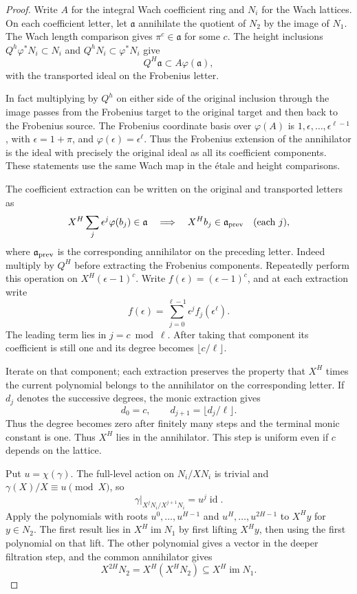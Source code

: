 \begin{proof}
Write \(A\) for the integral Wach coefficient ring
and \(N_i\) for the Wach lattices. On each coefficient
letter, let \(\mathfrak a\) annihilate the quotient of
\(N_2\) by the image of \(N_1\).
The Wach length comparison gives
\(\pi^c\in\mathfrak a\) for some \(c\).
The height inclusions
\(Q^h\varphi^*N_i\subset N_i\) and
\(Q^hN_i\subset\varphi^*N_i\) give
\[
 Q^H\mathfrak a\subset A\varphi(\mathfrak a),
\]
with the transported ideal on the Frobenius letter.

In fact multiplying by \(Q^h\) on either side of
the original inclusion through the image passes from
the Frobenius target to the original target and
then back to the Frobenius source. The Frobenius
coordinate basis over \(\varphi(A)\) is
\(1,\epsilon,\ldots,\epsilon^{\ell-1}\), with
\(\epsilon=1+\pi\), and \(\varphi(\epsilon)=\epsilon^\ell\).
Thus the Frobenius extension of the annihilator is
the ideal with precisely the original ideal as all
its coefficient components. These statements use
the same Wach map in the étale and height comparisons.

The coefficient extraction can be written on the original and transported letters as
\[
 X^H\sum_j\epsilon^j\varphi(b_j)\in\mathfrak a\quad\Longrightarrow\quad X^H b_j\in\mathfrak a_{\rm prev}\quad(\text{each }j),
\]
where \(\mathfrak a_{\rm prev}\) is the corresponding annihilator on the preceding letter. Indeed multiply by \(Q^H\) before extracting the Frobenius components. Repeatedly perform
this operation on \(X^H(\epsilon-1)^c\).
Write \(f(\epsilon)=(\epsilon-1)^c\), and at each
extraction write
\[
 f(\epsilon)=\sum_{j=0}^{\ell-1}\epsilon^j f_j(\epsilon^\ell).
\]
The leading term lies in \(j=c\bmod\ell\). After
taking that component its coefficient is still one and its
degree becomes \(\lfloor c/\ell\rfloor\).

Iterate on that
component; each extraction preserves the property that
\(X^H\) times the current polynomial belongs to the
annihilator on the corresponding letter. If \(d_j\) denotes the successive degrees, the monic extraction gives
\[
 d_0=c,\qquad d_{j+1}=\lfloor d_j/\ell\rfloor.
\]
Thus the degree becomes zero after finitely many steps and the terminal monic constant is one.
Thus \(X^H\) lies in the annihilator. This step is uniform
even if \(c\) depends on the lattice.

Put \(u=\chi(\gamma)\).
The full-level action on \(N_i/XN_i\) is trivial and \(\gamma(X)/X\equiv u\pmod X\), so
\[
 \gamma|_{X^jN_i/X^{j+1}N_i}=u^j\operatorname{id}.
\]
Apply the polynomials with roots
\(u^0,\ldots,u^{H-1}\) and \(u^H,\ldots,u^{2H-1}\)
to \(X^H y\) for \(y\in N_2\).
The first result lies in \(X^H\operatorname{im}N_1\)
by first lifting \(X^Hy\), then using the first
polynomial on that lift. The other polynomial gives a vector in the deeper filtration step, and the common annihilator gives
\[
 X^{2H}N_2=X^H(X^HN_2)\subseteq X^H\operatorname{im}N_1.
\]


\end{proof}
